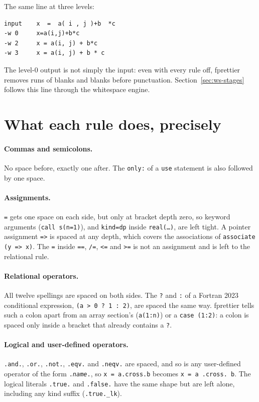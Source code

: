 \documentclass[11pt,a4paper,openany]{book}
\newcommand{\code}[1]{\texttt{\small #1}}
\begin{document}
The same line at three levels:

\begin{lstlisting}[style=plain]
input    x  =  a( i , j )+b  *c
-w 0     x=a(i,j)+b*c
-w 2     x = a(i, j) + b*c
-w 3     x = a(i, j) + b * c
\end{lstlisting}

The level-0 output is not simply the input: even with every rule off,
fprettier removes runs of blanks and blanks before punctuation.
Section~\ref{sec:ws-stages} follows this line through the whitespace engine.

\section{What each rule does, precisely}

\paragraph{Commas and semicolons.} No space before, exactly one after. The
\code{only:} of a \code{use} statement is also followed by one space.

\paragraph{Assignments.} \code{=} gets one space on each side, but only at
bracket depth zero, so keyword arguments (\code{call s(n=1)}), and
\code{kind=dp} inside \code{real(\ldots)}, are left tight. A pointer
assignment \code{=>} is spaced at any depth, which covers the
associations of \code{associate (y => x)}. The \code{=} inside \code{==},
\code{/=}, \code{<=} and \code{>=} is not an assignment and is left to the
relational rule.

\paragraph{Relational operators.} All twelve spellings are spaced on both
sides. The \code{?} and \code{:} of a Fortran 2023 conditional expression,
\code{(a > 0 ? 1 : 2)}, are spaced the same way. fprettier tells such a colon apart from an
array section's (\code{a(1:n)}) or a \code{case (1:2)}: a colon is spaced only
inside a bracket that already contains a \code{?}.

\paragraph{Logical and user-defined operators.} \code{.and.}, \code{.or.},
\code{.not.}, \code{.eqv.} and \code{.neqv.} are spaced, and so is any
user-defined operator of the form \code{.\textit{name}.}, so
\code{x = a.cross.b} becomes \code{x = a .cross. b}. The logical literals
\code{.true.} and \code{.false.} have the same shape but are left alone,
including any kind suffix (\code{.true.\_lk}).
\end{document}
